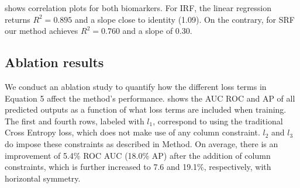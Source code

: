 


 shows correlation plots for both biomarkers. For IRF, the linear regression returns $R^2=0.895$ and a slope close to identity (1.09). On the contrary, for SRF our method achieves $R^2=0.760$ and a slope of 0.30.

\subsection{Ablation results}
We conduct an ablation study to quantify how the different loss terms in Equation 5 affect the method's performance.  shows the AUC ROC and AP of all predicted outputs as a function of what loss terms are included when training. The first and fourth rows, labeled with $l_1$, correspond to using the traditional Cross Entropy loss, which does not make use of any column constraint. $l_2$ and $l_3$ do impose these constraints as described in Method. On average, there is an improvement of 5.4\% ROC AUC (18.0\% AP) after the addition of column constraints, which is further increased to 7.6 and 19.1\%, respectively, with horizontal symmetry.

